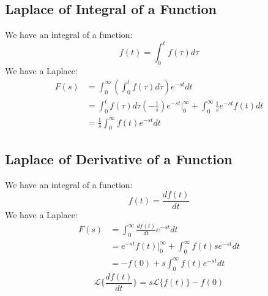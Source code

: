 \documentclass[12pt,a4paper]{article}
\begin{document}
	\subsection{Laplace of Integral of a Function}
	We have an integral of a function:
	\[
	f(t) = \int_{0}^{t} f(\tau) d\tau
	\]
	We have a Laplace:
	\[
	\begin{split}
		F(s) &= \int_{0}^{\infty} (\int_{0}^{t} f(\tau) d\tau) e^{-st} dt \\
		     &= \int_{0}^{t} f(\tau) d\tau (-\frac{1}{s}) e^{-st} |_0^\infty + \int_{0}^{\infty} \frac{1}{s} e^{-st} f(t) dt \\
		     &= \frac{1}{s} \int_{0}^{\infty} f(t) e^{-st} dt
	\end{split}
	\]
	
	\subsection{Laplace of Derivative of a Function}
	We have an integral of a function:
	\[
	f(t) = \frac{df(t)}{dt}
	\]
	We have a Laplace:
	\[
	\begin{split}
		F(s) &= \int_{0}^{\infty} \frac{df(t)}{dt} e^{-st} dt \\
		     &= e^{-st} f(t) |_0^\infty + \int_{0}^{\infty} f(t) se^{-st} dt \\
		     &= -f(0) + s \int_{0}^{\infty} f(t) e^{-st} dt
	\end{split}
	\]
	\[
	\mathcal{L}\{\frac{df(t)}{dt}\} = s\mathcal{L}\{f(t)\} - f(0)
	\]
	
	
\end{document}
